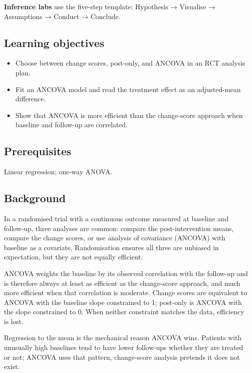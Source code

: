 \documentclass[
]{article}
\author{}
\date{\vspace{-2.5em}}
\providecommand{\tightlist}{%
  \setlength{\itemsep}{0pt}\setlength{\parskip}{0pt}}
\begin{document}
\textbf{Inference labs} use the five-step template: Hypothesis →
Visualise → Assumptions → Conduct → Conclude.

\subsection{Learning objectives}\label{learning-objectives}

\begin{itemize}
\tightlist
\item
  Choose between change scores, post-only, and ANCOVA in an RCT analysis
  plan.
\item
  Fit an ANCOVA model and read the treatment effect as an adjusted-mean
  difference.
\item
  Show that ANCOVA is more efficient than the change-score approach when
  baseline and follow-up are correlated.
\end{itemize}

\subsection{Prerequisites}\label{prerequisites}

Linear regression; one-way ANOVA.

\subsection{Background}\label{background}

In a randomised trial with a continuous outcome measured at baseline and
follow-up, three analyses are common: compare the post-intervention
means, compare the change scores, or use analysis of covariance (ANCOVA)
with baseline as a covariate. Randomisation ensures all three are
unbiased in expectation, but they are not equally efficient.

ANCOVA weights the baseline by its observed correlation with the
follow-up and is therefore always at least as efficient as the
change-score approach, and much more efficient when that correlation is
moderate. Change scores are equivalent to ANCOVA with the baseline slope
constrained to 1; post-only is ANCOVA with the slope constrained to 0.
When neither constraint matches the data, efficiency is lost.

Regression to the mean is the mechanical reason ANCOVA wins. Patients
with unusually high baselines tend to have lower follow-ups whether they
are treated or not; ANCOVA uses that pattern, change-score analysis
pretends it does not exist.
\end{document}
